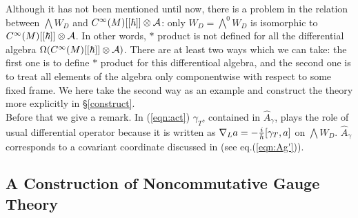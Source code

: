 \documentclass[10pt,a4paper]{article}
\def\h{\hbar}
\def\hA{{\hat A}}
\begin{document}
Although it has not been mentioned until now, there is a problem in the relation between ${\scriptstyle \bigwedge} W_D$ and $C^\infty(M)[[\h]]\otimes {\cal A}$: only $W_D={\scriptstyle \bigwedge}^0 W_D$ is isomorphic to $C^\infty(M)[[\h]]\otimes {\cal A}$. In other words, $*$ product is not defined for all the differential algebra $\Omega(C^\infty(M)[[\h]]\otimes {\cal A})$. There are at least two ways which we can take: the first one is to define $*$ product for this differentioal algebra, and the second one is to treat all elements of the algebra only componentwise with respect to some fixed frame.
We here take the second way as an example and construct the theory more explicitly in \S\ref{construct}.\\

Before that we give a remark. In (\ref{eqn:act}) $\gamma_T$, contained in $\hA_\gamma$, plays the role of usual differential operator because it is written as $\nabla_La=-{i\over\h}[\gamma_T,a]$ on ${\scriptstyle \bigwedge} W_D$. $\hA_\gamma$ corresponds to a covariant coordinate discussed in \cite{MSSW} (see eq.(\ref{eqn:Ag'})).




\subsection{A Construction of Noncommutative Gauge Theory
\label{construct}}
\end{document}
